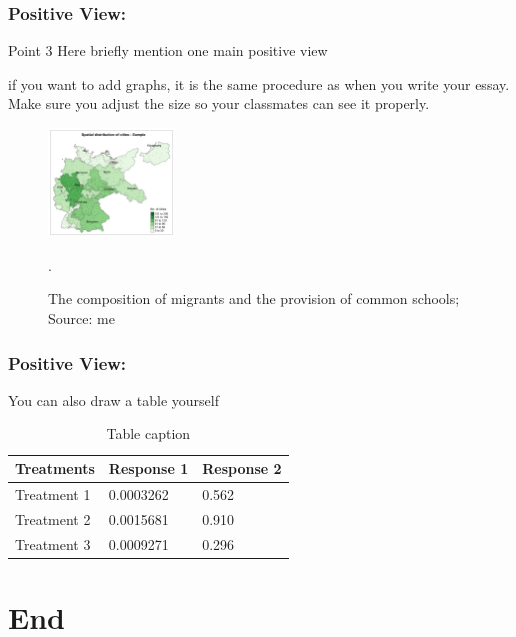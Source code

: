 \documentclass{beamer}
\begin{document}


\begin{frame}
\frametitle{Positive View: }

\begin{block}{Point 3}
Here briefly mention one main positive view
\end{block}

if you want to add graphs, it is the same procedure as when you write your essay. Make sure you adjust the size so your classmates can see it properly.
\begin{figure}[hbt!]
    \centering
    \includegraphics[width=0.3\textwidth]{paper/output/descriptive/map_cities_sample.png}
    \caption{The composition of migrants and the provision of common schools; Source: me}.
    \label{table:my_label}
\end{figure}

\end{frame}


\begin{frame}
\frametitle{Positive View: }
You can also draw a table yourself

\begin{table}
\begin{tabular}{l l l}
\toprule
\textbf{Treatments} & \textbf{Response 1} & \textbf{Response 2}\\
\midrule
Treatment 1 & 0.0003262 & 0.562 \\
Treatment 2 & 0.0015681 & 0.910 \\
Treatment 3 & 0.0009271 & 0.296 \\
\bottomrule
\end{tabular}
\caption{Table caption}
\end{table}

\end{frame}



\section{End}%
\end{document}
